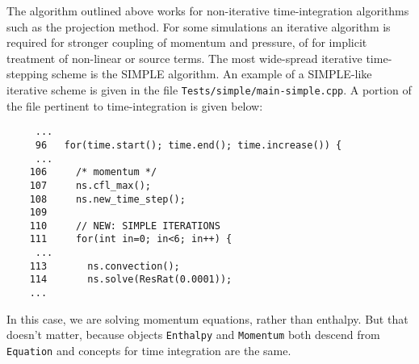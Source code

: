The algorithm outlined above works for non-iterative time-integration algorithms
such as the projection method. For some simulations an iterative algorithm is 
required for stronger coupling of momentum and pressure, of for implicit 
treatment of non-linear or source terms. The most wide-spread iterative 
time-stepping scheme is the SIMPLE algorithm. An example of a SIMPLE-like
iterative scheme is given in the file {\tt Tests/simple/main-simple.cpp}.
A portion of the file pertinent to time-integration is given below:
%
{\small \begin{verbatim}
     ...
     96   for(time.start(); time.end(); time.increase()) {
     ...
    106     /* momentum */
    107     ns.cfl_max();
    108     ns.new_time_step();
    109
    110     // NEW: SIMPLE ITERATIONS
    111     for(int in=0; in<6; in++) {
     ...                         
    113       ns.convection();
    114       ns.solve(ResRat(0.0001));
    ...
\end{verbatim}}
%
In this case, we are solving momentum equations, rather than enthalpy. But that
doesn't matter, because objects {\tt Enthalpy} and {\tt Momentum} both descend
from {\tt Equation} and concepts for time integration are the same.

